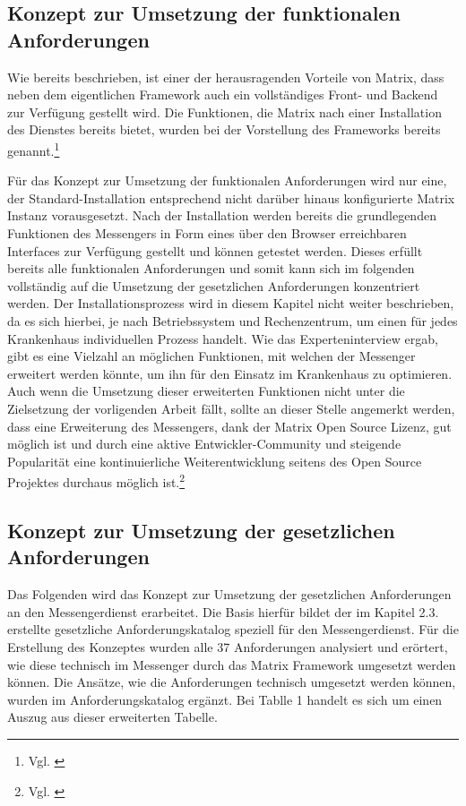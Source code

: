 \subsection{Konzept zur Umsetzung der funktionalen Anforderungen}\label{chapter:am}
Wie bereits beschrieben, ist einer der herausragenden Vorteile von Matrix, dass neben dem eigentlichen Framework auch ein vollständiges Front- und Backend zur Verfügung gestellt wird. Die Funktionen, die Matrix nach einer Installation des Dienstes bereits bietet, wurden bei der Vorstellung des Frameworks bereits genannt.\footnote{Vgl. \cite{Github2020}}

Für das Konzept zur Umsetzung der funktionalen Anforderungen wird nur eine, der Standard-Installation entsprechend nicht darüber hinaus konfigurierte Matrix Instanz vorausgesetzt. Nach der Installation werden bereits die grundlegenden Funktionen des Messengers in Form eines über den Browser erreichbaren Interfaces zur Verfügung gestellt und können getestet werden. Dieses erfüllt bereits alle funktionalen Anforderungen und somit kann sich im folgenden vollständig auf die Umsetzung der gesetzlichen Anforderungen konzentriert werden.
Der Installationsprozess wird in diesem Kapitel nicht weiter beschrieben, da es sich hierbei, je nach Betriebssystem und Rechenzentrum, um einen für jedes Krankenhaus individuellen Prozess handelt.
Wie das Experteninterview ergab, gibt es eine Vielzahl an möglichen Funktionen, mit welchen der Messenger erweitert werden könnte, um ihn für den Einsatz im Krankenhaus zu optimieren. Auch wenn die Umsetzung dieser erweiterten Funktionen nicht unter die Zielsetzung der vorligenden Arbeit fällt, sollte an dieser Stelle angemerkt werden, dass eine Erweiterung des Messengers, dank der Matrix Open Source Lizenz, gut möglich ist und durch eine aktive Entwickler-Community und steigende Popularität eine kontinuierliche Weiterentwicklung seitens des Open Source Projektes durchaus möglich ist.\footnote{Vgl. \cite{Github2020}}

\subsection{Konzept zur Umsetzung der gesetzlichen Anforderungen}\label{chapter:vdmf}
Das Folgenden wird das Konzept zur Umsetzung der gesetzlichen Anforderungen an den Messengerdienst erarbeitet.
Die Basis hierfür bildet der im Kapitel 2.3. erstellte gesetzliche Anforderungskatalog speziell für den Messengerdienst. Für die Erstellung des Konzeptes wurden alle 37 Anforderungen analysiert und erörtert, wie diese technisch im Messenger durch das Matrix Framework umgesetzt werden können. Die Ansätze, wie die Anforderungen technisch umgesetzt werden können, wurden im Anforderungskatalog ergänzt. Bei Tablle 1 handelt es sich um einen Auszug aus dieser erweiterten Tabelle. 

